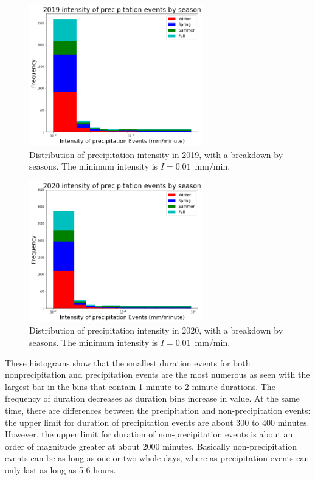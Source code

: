 \documentclass[11pt]{report}
\begin{document}
\begin{figure}[t]
  \centering
  \includegraphics[width=0.675\textwidth]{Figures/inten2019.png}
  \caption[Intensity histogram for 2019 broken down by season]
          {\label{i2019}Distribution of precipitation intensity in 2019,
            with a breakdown by seasons. The minimum intensity is
            $I=0.01$~mm/min.  }
\end{figure}
\begin{figure}[b]
  \centering
  \includegraphics[width=0.675\textwidth]{Figures/inten2020.png}
  \caption[Intensity histogram for 2020 broken down by season]
          {\label{i2020} Distribution of precipitation intensity in 2020,
            with a breakdown by seasons. The minimum intensity is
            $I=0.01$~mm/min.}
\end{figure}
\clearpage

These histograms show that the smallest duration events for both
nonprecipitation and precipitation events are the most numerous as seen with
the largest bar in the bins that contain 1 minute to 2 minute durations. The
frequency of duration decreases as duration bins increase in value. At the
same time, there are differences between the precipitation and
non-precipitation events: the upper limit for duration of precipitation
events are about 300 to 400 minutes. However, the upper limit for duration
of non-precipitation events is about an order of magnitude greater at about
2000 minutes. Basically non-precipitation events can be as long as one or
two whole days, where as precipitation events can only last as long as 5-6
hours.
\end{document}
